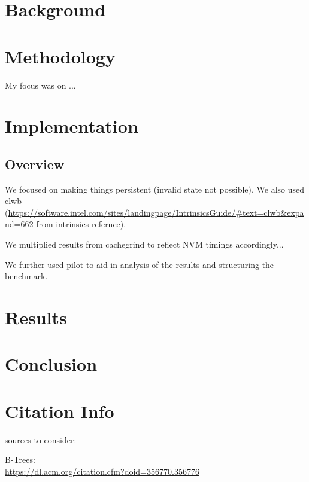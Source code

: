 \documentclass{article}
\begin{document}
\section{Background}

\section{Methodology}

My focus was on ...

\section{Implementation}

\subsection{Overview}

We focused on making things persistent (invalid state not possible). We also
used clwb
(\url{https://software.intel.com/sites/landingpage/IntrinsicsGuide/#text=clwb&expand=662}
from intrinsics refernce).

We multiplied results from cachegrind to reflect NVM timings accordingly...

We further used pilot to aid in analysis of the results and structuring the
benchmark.

\section{Results}

\section{Conclusion}

\section{Citation Info}


sources to consider:

B-Trees:\\
\url{https://dl.acm.org/citation.cfm?doid=356770.356776}
\end{document}
